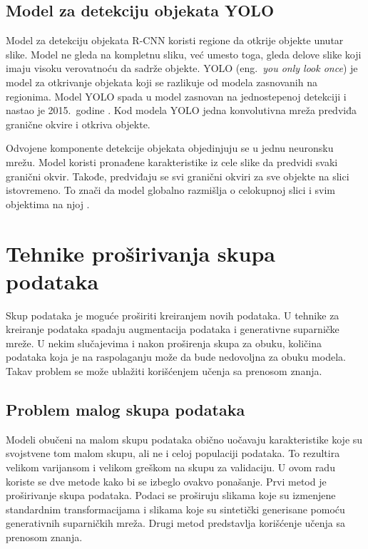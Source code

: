 \documentclass[12pt,oneside]{memoir}
\begin{document}
\section{Model za detekciju objekata YOLO}
Model za detekciju objekata R-CNN koristi regione da otkrije objekte unutar slike. Model ne gleda na kompletnu sliku, već umesto toga, gleda delove slike koji imaju visoku verovatnoću da sadrže objekte. YOLO (eng.~\textit{you only look once}) je model za otkrivanje objekata koji se razlikuje od modela zasnovanih na regionima. Model YOLO spada u model zasnovan na jednostepenoj detekciji i nastao je 2015.~godine \cite{redmon2016you}. Kod modela YOLO jedna konvolutivna mreža predviđa granične okvire i otkriva objekte.%

Odvojene komponente detekcije objekata objedinjuju se u jednu neuronsku mrežu. Model koristi pronađene karakteristike iz cele slike da predvidi svaki granični okvir. Takođe, predviđaju se svi granični okviri za sve objekte na slici istovremeno. To znači da model globalno razmišlja o celokupnoj slici i svim objektima na njoj \cite{redmon2016you}.


\chapter{Tehnike proširivanja skupa podataka}
\label{section3}

Skup podataka je moguće proširiti kreiranjem novih podataka. U tehnike za kreiranje podataka spadaju augmentacija podataka i generativne suparničke mreže. U nekim slučajevima i nakon proširenja skupa za obuku, količina podataka koja je na raspolaganju može da bude nedovoljna za obuku modela. Takav problem se može ublažiti korišćenjem učenja sa prenosom znanja. 

\section{Problem malog skupa podataka}

Modeli obučeni na malom skupu podataka obično uočavaju karakteristike koje su svojstvene tom malom skupu, ali ne i celoj populaciji podataka. To rezultira velikom varijansom i velikom greškom na skupu za validaciju. U ovom radu koriste se dve metode kako bi se izbeglo ovakvo ponašanje. Prvi metod je proširivanje skupa podataka.
Podaci se proširuju slikama koje su izmenjene standardnim transformacijama i slikama koje su sintetički generisane pomoću generativnih suparničkih mreža.
Drugi metod predstavlja korišćenje učenja sa prenosom znanja.
\end{document}

